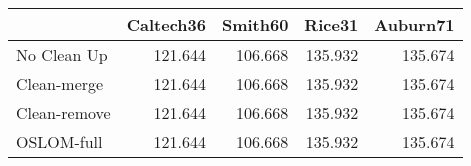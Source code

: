 \begin{tabular}{lrrrr}
\toprule
{} & Caltech36 & Smith60 &  Rice31 & Auburn71 \\
\midrule
No Clean Up  &   121.644 & 106.668 & 135.932 &  135.674 \\
Clean-merge  &   121.644 & 106.668 & 135.932 &  135.674 \\
Clean-remove &   121.644 & 106.668 & 135.932 &  135.674 \\
OSLOM-full   &   121.644 & 106.668 & 135.932 &  135.674 \\
\bottomrule
\end{tabular}
